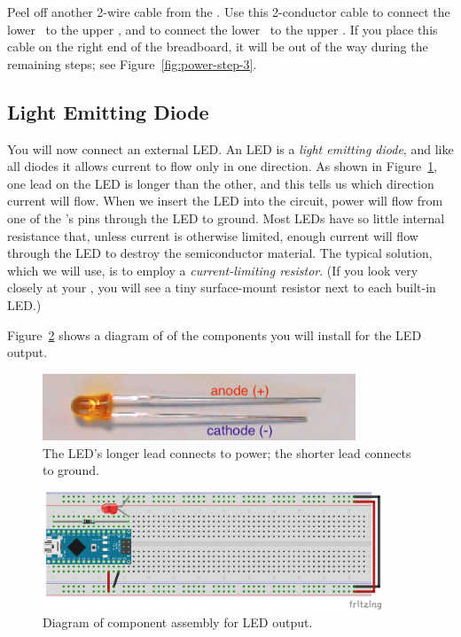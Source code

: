 Peel off another 2-wire cable from the \rainbow. Use this 2-conductor cable to
connect the lower \power\ to the upper \power, and to connect the lower
\ground\ to the upper \ground. If you place this cable on the right end of the
breadboard, it will be out of the way during the remaining steps; see
Figure~\ref{fig:power-step-3}.


\subsection{Light Emitting Diode}

You will now connect an external LED. An LED is a \textit{light emitting diode},
and like all diodes it allows current to flow only in one direction. As shown
in Figure~\ref{fig:led-annotated}, one lead on the LED is longer than the
other, and this tells us which direction current will flow. When we insert the
LED into the circuit, power will flow from one of the \nano's pins through the
LED to ground. Most LEDs have so little internal resistance that, unless
current is otherwise limited, enough current will flow through the LED to
destroy the semiconductor material. The typical solution, which we will use, is
to employ a \textit{current-limiting resistor}. (If you look very closely at
your \nano, you will see a tiny surface-mount resistor next to each built-in
LED.)

Figure~\ref{fig:led-diagram} shows a diagram of of the components you will
install for the LED output.

\begin{figure}
    \centering
    \includegraphics[height=2cm]{led-annotated}
    \caption{The LED's longer lead connects to power; the shorter lead connects
        to ground.\label{fig:led-annotated}}
\end{figure}

\begin{figure}
    \centering
    \includegraphics[width=0.9\textwidth]{fritzing_images/led}
    \caption{Diagram of component assembly for LED output.
        \label{fig:led-diagram}}
\end{figure}

